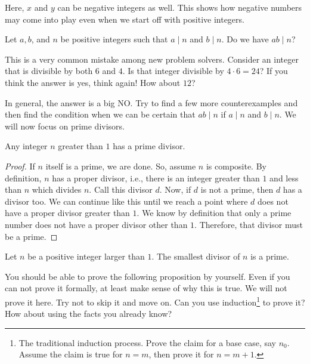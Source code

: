\documentclass{subfile}
\begin{document}
	\begin{note}
		Here, $x$ and $y$ can be negative integers as well. This shows how negative numbers may come into play even when we start off with positive integers.
	\end{note}

	\begin{question}
		Let $a,b$, and $n$ be positive integers such that $a\mid n$ and $b\mid n$. Do we have $ab \mid n$?
	\end{question}
	This is a very common mistake among new problem solvers. Consider an integer that is divisible by both $6$ and $4$. Is that integer divisible by $4\cdot6=24$? If you think the answer is yes, think again! How about $12$?

	In general, the answer is a big NO. Try to find a few more counterexamples and then find the condition when we can be certain that $ab \mid n$ if $a\mid n$ and $b\mid n$. We will now focus on prime divisors.

	\begin{proposition}
		Any integer $n$ greater than $1$ has a prime divisor.
	\end{proposition}

	\begin{proof}
		If $n$ itself is a prime, we are done. So, assume $n$ is composite. By definition, $n$ has a proper divisor, i.e., there is an integer greater than $1$ and less than $n$ which divides $n$. Call this divisor $d$. Now, if $d$ is not a prime, then $d$ has a divisor too. We can continue like this until we reach a point where $d$ does not have a proper divisor greater than $1$. We know by definition that only a prime number does not have a proper divisor other than $1$. Therefore, that divisor must be a prime.
	\end{proof}

	\begin{corollary}\label{cor:smallestdivisor}
		Let $n$ be a positive integer larger than $1$. The smallest divisor of $n$ is a prime.
	\end{corollary}

	You should be able to prove the following proposition by yourself. Even if you can not prove it formally, at least make sense of why this is true. We will not prove it here. Try not to skip it and move on. Can you use induction\footnote{The traditional induction process. Prove the claim for a base case, say $n_0$. Assume the claim is true for $n=m$, then prove it for $n=m+1$.} to prove it? How about using the facts you already know?
\end{document}
